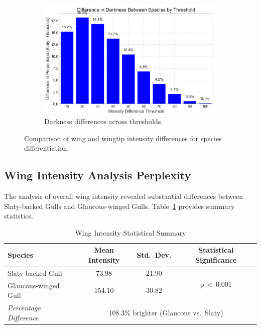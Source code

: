 \documentclass[a4paper,12pt]{report}
\begin{document}
\begin{figure}[H]
    \hfill
    \begin{subfigure}[b]{0.32\textwidth}
        \centering
        \includegraphics[width=\textwidth]{images/REPORT_IMAGES_INTENSITY/I1/diffbythresh.png}
        \caption{Darkness differences across thresholds.}
        \label{fig:diff_by_thresh}
    \end{subfigure}
    \caption{Comparison of wing and wingtip intensity differences for species differentiation.}
    \label{fig:wingtip_contrast_combined}
\end{figure}


\subsection{Wing Intensity Analysis Perplexity}

The analysis of overall wing intensity revealed substantial differences between Slaty-backed Gulls and Glaucous-winged Gulls. Table~\ref{tab:wingintensity-stats} provides summary statistics.

\begin{table}[H]
    \centering
    \caption{Wing Intensity Statistical Summary}
    \label{tab:wingintensity-stats}
    \begin{tabular}{lccc}
        \toprule
        Species & Mean Intensity & Std.\ Dev. & Statistical Significance \\
        \midrule
        Slaty-backed Gull & 73.98 & 21.90 & \multirow{2}{*}{p\,$<$\,0.001} \\
        Glaucous-winged Gull & 154.10 & 30.82 & \\
        \textit{Percentage Difference} & \multicolumn{3}{c}{108.3\% brighter (Glaucous vs.\ Slaty)} \\
        \bottomrule
    \end{tabular}
\end{table}
\end{document}
